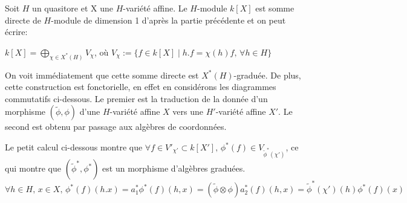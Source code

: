 \begin{cons}
Soit $H$ un quasitore et X une $H$-variété affine. Le $H$-module $k[X]$ est somme directe de $H$-module de dimension 1 d'après la partie précédente et on peut écrire: 
\begin{center}
$k[X]=\bigoplus_{\chi \in X^*(H)}V_\chi$,  où $V_\chi:=\lbrace f\in k[X]\mid h.f=\chi(h)f,\, \forall h\in H \rbrace$ 
\end{center}
On voit immédiatement que cette somme directe est $X^*(H)$-graduée. De plus, cette construction est fonctorielle, en effet en considérons les diagrammes commutatifs ci-dessous. Le premier est la traduction de la donnée d'un morphisme $(\widetilde{\phi},\phi)$ d'une $H$-variété affine $X$ vers une $H'$-variété affine $X'$. Le second est obtenu par passage aux algèbres de coordonnées.
\begin{multicols}{2}
	\begin{center}
	\end{center}

	\columnbreak
	\begin{center}
	\end{center}
\end{multicols}
Le petit calcul ci-dessous montre que $\forall f\in V'_{\chi'}\subset k[X'],\,	\phi^*(f)\in V_{\widetilde{\phi}^*(\chi')}$, ce qui montre que $(\widetilde{\phi}^*,\phi^*)$ est un morphisme d'algèbres graduées. 
$$\forall h\in H,\,x\in X,\, \phi^*(f)(h.x)=a_1^*\phi^*(f)(h, x)=(\widetilde{\phi}\otimes\phi)a_2^*(f)(h,x)=\widetilde{\phi}^*(\chi')(h)\phi^*(f)(x)$$ 

\end{cons}


